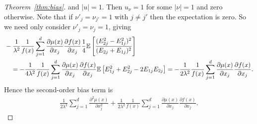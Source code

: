 \begin{proof}[Theorem~\ref{thm:bias}]
  and $|u|=1$. Then $u_\nu = 1$ for some $|\nu| = 1$ and zero otherwise.
  Note that if $\nu'_j = \nu_{j'} = 1$ with $j \neq j'$ then the
  expectation is zero. So we need only consider $\nu'_j = \nu_j = 1$, giving
  \begin{align*}
    &- \frac{1}{\lambda^2}
    \frac{1}{f(x)}
    \sum_{j=1}^{d}
    \frac{\partial \mu(x)}{\partial x_j}
    \frac{\partial f(x)}{\partial x_j}
    \frac{1}{4}
    \mathbb{E} \left[
      \frac{(E_{2j}^2 - E_{1j}^2)^2}
      {(E_{2j} + E_{1j})^2}
    \right] \\
    &\quad=
    - \frac{1}{4 \lambda^2}
    \frac{1}{f(x)}
    \sum_{j=1}^{d}
    \frac{\partial \mu(x)}{\partial x_j}
    \frac{\partial f(x)}{\partial x_j}
    \mathbb{E} \left[
      E_{1j}^2
      + E_{2j}^2
      - 2 E_{1j} E_{2j}
    \right]
    =
    - \frac{1}{2 \lambda^2}
    \frac{1}{f(x)}
    \sum_{j=1}^{d}
    \frac{\partial \mu(x)}{\partial x_j}
    \frac{\partial f(x)}{\partial x_j}.
  \end{align*}
  Hence the second-order bias term is
  \begin{align*}
    \frac{1}{2 \lambda^2}
    \sum_{j=1}^d
    \frac{\partial^2 \mu(x)}{\partial x_j^2}
    + \frac{1}{2 \lambda^2}
    \frac{1}{f(x)}
    \sum_{j=1}^{d}
    \frac{\partial \mu(x)}{\partial x_j}
    \frac{\partial f(x)}{\partial x_j}.
  \end{align*}



\end{proof}
